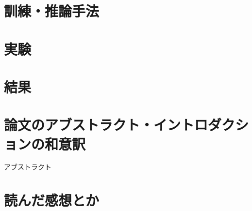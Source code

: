 \documentclass[a4paper, dvipdfmx, 10pt]{article}
\begin{document}
\section{訓練・推論手法}
\label{sec:org2ba1801}
\section{実験}
\label{sec:orgfb157d0}
\section{結果}
\label{sec:org2ba663c}
\section{論文のアブストラクト・イントロダクションの和意訳}
\label{sec:org1d2865c}
アブストラクト\\
\section{読んだ感想とか}
\label{sec:orgaf1a5bc}
\end{document}

